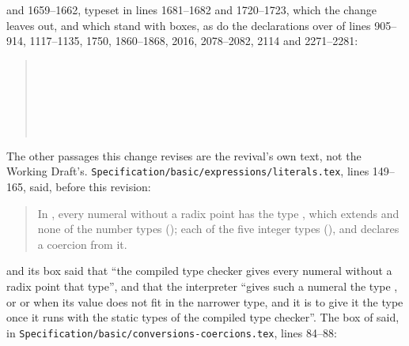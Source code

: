 \begin{description}
and 1659--1662, typeset in lines 1681--1682 and 1720--1723, which the change
leaves out, and which stand with boxes, as do the declarations over
 of lines 905--914, 1117--1135, 1750, 1860--1868, 2016,
2078--2082, 2114 and 2271--2281:
\begin{quote}
\\
\quad{}\\
\\
\quad{}\\
\\
\quad{}
\end{quote}
The other passages this change revises are the revival's own text, not the
Working Draft's.
\nolinkurl{Specification/basic/expressions/literals.tex}, lines 149--165, said,
before this revision:
\begin{quote}
In \library, every numeral without a radix point has the type
, which extends  and none of the number types
(); each of the five integer types
(),  and  declares a
coercion from it.
\end{quote}
and its box said that ``the compiled type checker gives every numeral without a
radix point that type'', and that the interpreter ``gives such a numeral the
type , or  or  when its
value does not fit in the narrower type, and it is to give it the type
 once it runs with the static types of the compiled type
checker''.
The box of  said, in
\nolinkurl{Specification/basic/conversions-coercions.tex}, lines 84--88:

\end{description}
